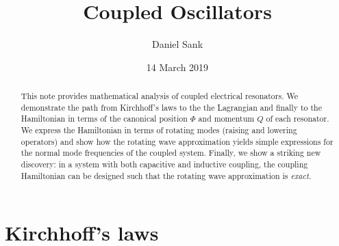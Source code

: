 \documentclass{article}
\author{Daniel Sank}
\date{14 March 2019}
\title{Coupled Oscillators}
\begin{document}
\maketitle

\begin{abstract}
  This note provides mathematical analysis of coupled electrical resonators.
  We demonstrate the path from Kirchhoff's laws to the the Lagrangian and finally to the Hamiltonian in terms of the canonical position $\Phi$ and momentum $Q$ of each resonator.
  We express the Hamiltonian in terms of rotating modes (raising and lowering operators) and show how the rotating wave approximation yields simple expressions for the normal mode frequencies of the coupled system.
  Finally, we show a striking new discovery: in a system with both capacitive and inductive coupling, the coupling Hamiltonian can be designed such that the rotating wave approximation is \emph{exact}.
\end{abstract}

\tableofcontents

\section{Kirchhoff's laws}

\end{document}
